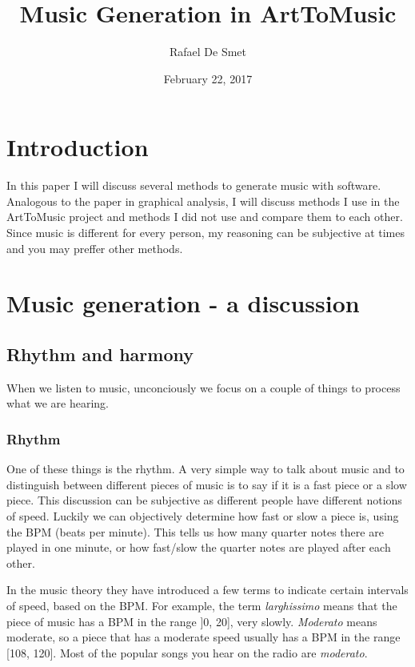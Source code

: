 \documentclass[12pt]{article}
\begin{document}
\title{Music Generation in ArtToMusic}
\date{February 22, 2017}
\author{Rafael De Smet}

\maketitle
\tableofcontents

\section{Introduction}

In this paper I will discuss several methods to generate music with software. Analogous to the paper in graphical analysis, I will discuss methods I use in the ArtToMusic project and methods I did not use and compare them to each other. Since music is different for every person, my reasoning can be subjective at times and you may preffer other methods. 

\section{Music generation - a discussion}

\subsection{Rhythm and harmony}

When we listen to music, unconciously we focus on a couple of things to process what we are hearing.

\subsubsection{Rhythm}

One of these things is the rhythm. A very simple way to talk about music and to distinguish between different pieces of music is to say if it is a fast piece or a slow piece. This discussion can be subjective as different people have different notions of speed. Luckily we can objectively determine how fast or slow a piece is, using the BPM (beats per minute).
This tells us how many quarter notes there are played in one minute, or how fast/slow the quarter notes are played after each other.
\newline

In the music theory they have introduced a few terms to indicate certain intervals of speed, based on the BPM. For example, the term \textit{larghissimo} means that the piece of music has a BPM in the range ]0, 20], very slowly. \textit{Moderato} means moderate, so a piece that has a moderate speed usually has a BPM in the range [108, 120]. Most of the popular songs you hear on the radio are \textit{moderato}.
\newline
\end{document}
